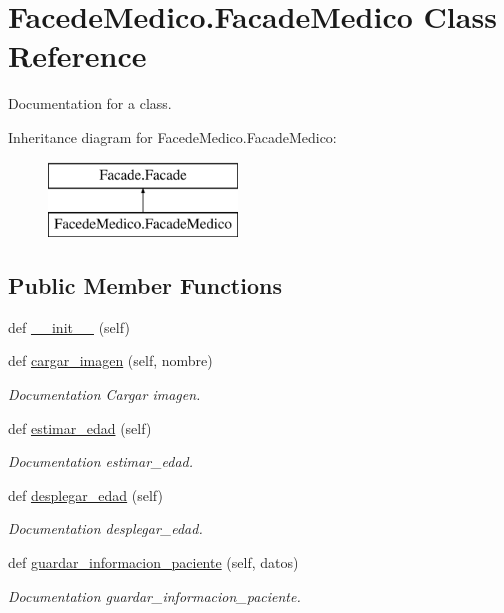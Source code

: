 \hypertarget{class_facede_medico_1_1_facade_medico}{}\section{Facede\+Medico.\+Facade\+Medico Class Reference}
\label{class_facede_medico_1_1_facade_medico}


Documentation for a class.  


Inheritance diagram for Facede\+Medico.\+Facade\+Medico\+:\begin{figure}[H]
\begin{center}
\leavevmode
\includegraphics[height=2.000000cm]{class_facede_medico_1_1_facade_medico}
\end{center}
\end{figure}
\subsection*{Public Member Functions}
\begin{DoxyCompactItemize}
\item 
def \mbox{\hyperlink{class_facede_medico_1_1_facade_medico_a461dbe3bea34efedec3c2425e48982da}{\+\_\+\+\_\+init\+\_\+\+\_\+}} (self)
\item 
def \mbox{\hyperlink{class_facede_medico_1_1_facade_medico_a012407bf5a1b178924a8d3dfcc9e579c}{cargar\+\_\+imagen}} (self, nombre)
\begin{DoxyCompactList}\small\item\em Documentation Cargar imagen. \end{DoxyCompactList}\item 
def \mbox{\hyperlink{class_facede_medico_1_1_facade_medico_a23738769ea9bd5016e9bc191c83a3fed}{estimar\+\_\+edad}} (self)
\begin{DoxyCompactList}\small\item\em Documentation estimar\+\_\+edad. \end{DoxyCompactList}\item 
def \mbox{\hyperlink{class_facede_medico_1_1_facade_medico_a865f5e402914ba2461306bed197fc3c7}{desplegar\+\_\+edad}} (self)
\begin{DoxyCompactList}\small\item\em Documentation desplegar\+\_\+edad. \end{DoxyCompactList}\item 
def \mbox{\hyperlink{class_facede_medico_1_1_facade_medico_a8f1f5c7f6bf4689f905e8aa6e60f45e2}{guardar\+\_\+informacion\+\_\+paciente}} (self, datos)
\begin{DoxyCompactList}\small\item\em Documentation guardar\+\_\+informacion\+\_\+paciente. \end{DoxyCompactList}\end{DoxyCompactItemize}
